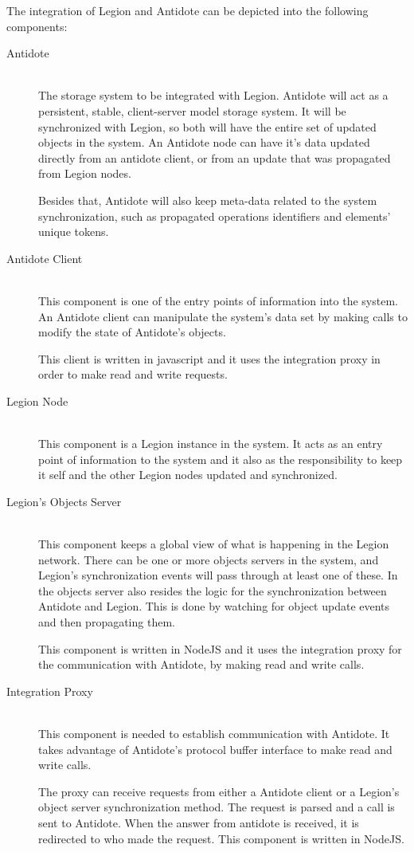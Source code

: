 \par
	The integration of Legion and Antidote can be depicted into the following components:
\begin{description}

\item[Antidote] \hfill \\
The storage system to be integrated with Legion. Antidote will act as a persistent, stable, client-server model storage system. It will be synchronized with Legion, so both will have the entire set of updated objects in the system. An Antidote node can have it's data updated directly from an antidote client, or from an update that was propagated from Legion nodes.\par
Besides that, Antidote will also keep meta-data related to the system synchronization, such as propagated operations identifiers and elements' unique tokens.

\item[Antidote Client] \hfill \\
This component is one of the entry points of information into the system. An Antidote client can manipulate the system's data set by making calls to modify the state of Antidote's objects.\par
	This client is written in javascript and it uses the integration proxy in order to make read and write requests.


\item[Legion Node] \hfill \\
This component is a Legion instance in the system. It acts as an entry point of information to the system and it also as the responsibility to keep it self and the other Legion nodes updated and synchronized.


\item[Legion's Objects Server] \hfill \\
This component keeps a global view of what is happening in the Legion network. There can be one or more objects servers in the system, and Legion's synchronization events will pass through at least one of these. In the objects server also resides the logic for the synchronization between Antidote and Legion. This is done by watching for object update events and then propagating them.\par
This component is written in NodeJS and it uses the integration proxy for the communication with Antidote, by making read and write calls.

\item[Integration Proxy] \hfill \\
This component is needed to establish communication with Antidote. It takes advantage of Antidote's protocol buffer interface to make read and write calls.\par
The proxy can receive requests from either a Antidote client or a Legion's object server synchronization method. The request is parsed and a call is sent to Antidote. When the answer from antidote is received, it is redirected to who made the request. This component is written in NodeJS.

\end{description}

